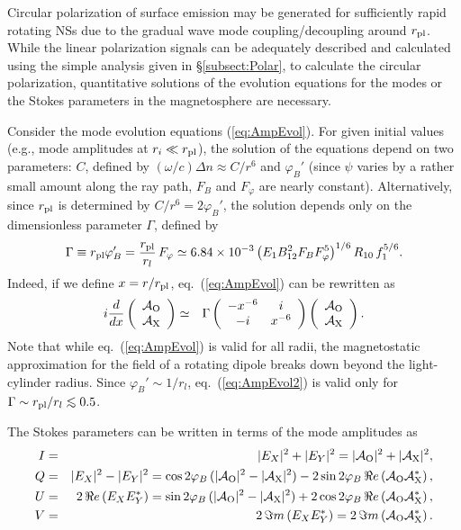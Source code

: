 \documentclass[useAMS,onecolumn,usenatbib,usegraphicx]{mn2e}
\def\be{\begin{equation}}
\def\ee{\end{equation}}
\def\lo{\mathrel{\raise.3ex\hbox{$<$}\mkern-14mu\lower0.6ex\hbox{$\sim$}}}
\begin{document}
Circular polarization of surface emission 
may be generated for sufficiently rapid rotating NSs 
due to the gradual wave mode coupling/decoupling around $r_{\rm pl}$.
While the linear polarization signals can be adequately described and 
calculated using the simple analysis given in \S \ref{subsect:Polar},
to calculate the circular polarization, quantitative
solutions of the evolution equations for the modes 
or the Stokes parameters in the magnetosphere are necessary.

Consider the mode evolution equations (\ref{eq:AmpEvol}). For given
initial values (e.g., mode amplitudes at $r_i\ll r_{\rm pl}$),
the solution of the equations depend on two parameters: $C$, defined
by $(\omega/c)\Delta n\approx C/r^6$ and $\varphi_B'$ (since $\psi$
varies by a rather small amount along the ray path, $F_B$ and
$F_\varphi$ are nearly constant).  Alternatively, since $r_{\rm pl}$
is determined by $C/r^6=2\varphi_B'$, the solution depends only on the
dimensionless parameter $\Gamma$, defined by
\be
\Gamma\equiv r_{\rm pl}\varphi_B'
={r_{\rm pl}\over r_l}\,F_\varphi
\simeq 6.84\times 10^{-3}
\left({E_1 B_{12}^2F_B F_{\varphi}^5}\right)^{1/6}R_{10}\,f_1^{5/6}.
\ee
Indeed,
if we define $x=r/r_{\rm pl}$, eq.~(\ref{eq:AmpEvol}) can be rewritten as
\begin{eqnarray}
\label{eq:AmpEvol2}
i{d\over dx} \left(\begin{array}{c}
{\cal A}_{\rm O}\\ {\cal A}_{\rm X}\end{array}\right)
& \simeq & \Gamma \left(\begin{array}{cc}
-x^{-6} & i\\ -i & x^{-6}\end{array}
\right)\left(\begin{array}{c}
{\cal A}_{\rm O}\\{\cal A}_{\rm X}\end{array}\right).
\end{eqnarray}
Note that while eq.~(\ref{eq:AmpEvol}) is valid for all radii, the
magnetostatic approximation for the field of a rotating dipole breaks
down beyond the light-cylinder radius. Since 
$\varphi_B'\sim 1/r_l$, eq.~(\ref{eq:AmpEvol2}) is valid
only for $\Gamma\sim r_{\rm pl}/r_l\lo 0.5$.

The Stokes parameters can be written in terms of the mode amplitudes as
\begin{eqnarray}
\label{eq:MagStokes}
I & = & |E_X|^2 + |E_Y|^2 = |{\cal A}_{\rm O}|^2+|{\cal A}_{\rm X}|^2,\\
Q & = & |E_X|^2 - |E_Y|^2 = \cos 2\varphi_B \,
(|{\cal A}_{\rm O}|^2-|{\cal A}_{\rm X}|^2)
-2\sin 2\varphi_B\, \Re e \left({\cal A}_{\rm O} {\cal A}_{\rm X}^\ast\right),\\
U & = & 2\,\Re e\left(E_X E_Y^*\right) = 
\sin 2\varphi_B\, (|{\cal A}_{\rm O}|^2-|{\cal A}_{\rm X}|^2) + 2\cos 2\varphi_B\, 
\Re e\left({\cal A}_{\rm O}{\cal A}_{\rm X}^*\right),\\
\label{eq:MagStokes4}
V & = & 2\,\Im m\left(E_XE_Y^*\right) = 
2\,\Im m\left({\cal A}_{\rm O}{\cal A}_{\rm X}^*\right).
\end{eqnarray}
\end{document}
